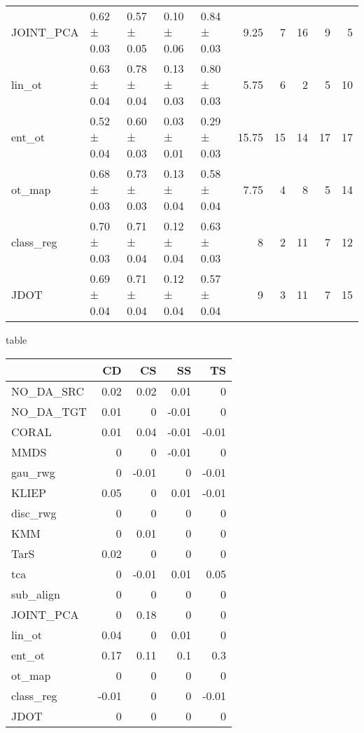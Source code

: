 \begin{tabular}{lllllrrrrr}
 JOINT\_PCA & 0.62 ± 0.03 & 0.57 ± 0.05 & 0.10 ± 0.06 & 0.84 ± 0.03 &          9.25 &                    7 &                     16 &               9 &                   5 \\
 lin\_ot    & 0.63 ± 0.04 & 0.78 ± 0.04 & 0.13 ± 0.03 & 0.80 ± 0.03 &          5.75 &                    6 &                      2 &               5 &                  10 \\
 ent\_ot    & 0.52 ± 0.04 & 0.60 ± 0.03 & 0.03 ± 0.01 & 0.29 ± 0.03 &         15.75 &                   15 &                     14 &              17 &                  17 \\
 ot\_map    & 0.68 ± 0.03 & 0.73 ± 0.03 & 0.13 ± 0.04 & 0.58 ± 0.04 &          7.75 &                    4 &                      8 &               5 &                  14 \\
 class\_reg & 0.70 ± 0.03 & 0.71 ± 0.04 & 0.12 ± 0.04 & 0.63 ± 0.03 &          8    &                    2 &                     11 &               7 &                  12 \\
 JDOT      & 0.69 ± 0.04 & 0.71 ± 0.04 & 0.12 ± 0.04 & 0.57 ± 0.04 &          9    &                    3 &                     11 &               7 &                  15 \\
\hline
\end{tabular}

\subsectionDelta table\begin{tabular}{lrrrr}
\hline
           &    CD &    CS &    SS &    TS \\
\hline
 NO\_DA\_SRC &  0.02 &  0.02 &  0.01 &  0    \\
 NO\_DA\_TGT &  0.01 &  0    & -0.01 &  0    \\
 CORAL     &  0.01 &  0.04 & -0.01 & -0.01 \\
 MMDS      &  0    &  0    & -0.01 &  0    \\
 gau\_rwg   &  0    & -0.01 &  0    & -0.01 \\
 KLIEP     &  0.05 &  0    &  0.01 & -0.01 \\
 disc\_rwg  &  0    &  0    &  0    &  0    \\
 KMM       &  0    &  0.01 &  0    &  0    \\
 TarS      &  0.02 &  0    &  0    &  0    \\
 tca       &  0    & -0.01 &  0.01 &  0.05 \\
 sub\_align &  0    &  0    &  0    &  0    \\
 JOINT\_PCA &  0    &  0.18 &  0    &  0    \\
 lin\_ot    &  0.04 &  0    &  0.01 &  0    \\
 ent\_ot    &  0.17 &  0.11 &  0.1  &  0.3  \\
 ot\_map    &  0    &  0    &  0    &  0    \\
 class\_reg & -0.01 &  0    &  0    & -0.01 \\
 JDOT      &  0    &  0    &  0    &  0    \\
\hline
\end{tabular}

